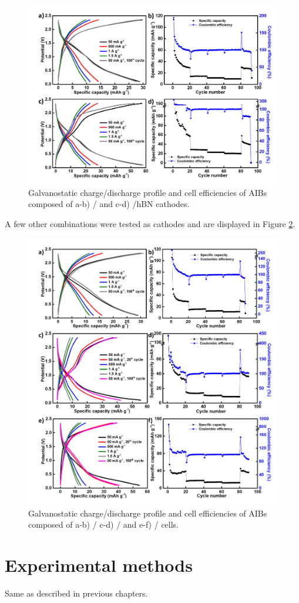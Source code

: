 \begin{figure}[tbh!]
\centering
\includegraphics[width=\textwidth]{Figures/BOhBN/BNdifO}
\caption{Galvanostatic charge/discharge profile and cell efficiencies of AIBs composed of a-b) / and c-d) /hBN cathodes.}
\label{Figures/BOhBN:BNdifO}
\end{figure}

A few other combinations were tested as cathodes and are displayed in Figure \ref{Figures/BOhBN:othON}.

\begin{figure}[tbh!]
\centering
\includegraphics[width=\textwidth]{Figures/BOhBN/othON}
\caption{Galvanostatic charge/discharge profile and cell efficiencies of AIBs composed of a-b) / c-d) / and e-f) / cells.}
\label{Figures/BOhBN:othON}
\end{figure}

\section{Experimental methods}
Same as described in previous chapters.

